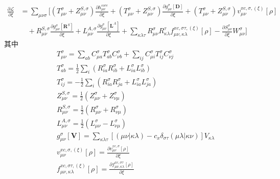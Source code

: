 \documentclass[11pt]{ctexart}
\numberwithin{equation}{section}
\begin{document}
\begin{equation}\label{eq:partial L}
    \begin{aligned}
        \frac{\partial\mathcal{L}}{\partial\xi} 
        &= \sum_{\mu\nu\sigma}\Bigg[
            (T_{\mu\nu}^{\sigma} + Z_{\mu\nu}^{S,\sigma})\frac{\partial h_{\mu\nu}^{core}}{\partial\xi}
            + (T_{\mu\nu}^{\sigma} + Z_{\mu\nu}^{S,\sigma})\frac{\partial g_{\mu\nu}^{\sigma}[\mathbf{D}]}{\partial\xi}
            + (T_{\mu\nu}^{\sigma} + Z_{\mu\nu}^{S,\sigma})v_{\mu\nu}^{xc,\sigma,(\xi)}[\rho]\\
        &\quad + R_{\mu\nu}^{S,\sigma}\frac{\partial g_{\mu\nu}^{\sigma}[\mathbf{R}^{S}]}{\partial\xi}
        + L_{\mu\nu}^{A,\sigma}\frac{\partial g_{\mu\nu}^{\sigma}[\mathbf{L}^{A}]}{\partial\xi}
        + \sum_{\kappa\lambda\tau}R_{\mu\nu}^{\sigma}R_{\kappa\lambda}^{\tau}f_{\mu\nu,\kappa\lambda}^{xc,\sigma\tau,(\xi)}[\rho] 
        - \frac{\partial S_{\mu\nu}^{\sigma}}{\partial\xi} W_{\mu\nu}^{\sigma}
        \Bigg]
    \end{aligned}
\end{equation}
其中
\begin{equation}
    \begin{aligned}
        & T_{\mu\nu}^{\sigma} = \sum_{ab} C_{\mu a}^{\sigma}T_{ab}^{\sigma}C_{\nu b}^{\sigma}
            + \sum_{ij}C_{\mu i}^{\sigma}T_{ij}^{\sigma}C_{\nu j}^{\sigma}\\
        & T_{ab}^{\sigma} = \frac{1}{2}\sum_{i}(R_{ia}^{\sigma}R_{ib}^{\sigma}+L_{ia}^{\sigma}L_{ib}^{\sigma})\\
        & T_{ij}^{\sigma} = - \frac{1}{2}\sum_{i}(R_{ia}^{\sigma}R_{ja}^{\sigma}+L_{ia}^{\sigma}L_{ja}^{\sigma})\\
        & Z_{\mu\nu}^{S,\sigma} = \frac{1}{2}(Z_{\mu\nu}^{\sigma} + Z_{\nu\mu}^{\sigma})\\
        & R_{\mu\nu}^{S,\sigma} = \frac{1}{2}(R_{\mu\nu}^{\sigma}+R_{\nu\mu}^{\sigma})\\
        & L_{\mu\nu}^{A,\sigma} = \frac{1}{2}(L_{\mu\nu}^{\sigma}-L_{\nu\mu}^{\sigma})\\
        & g_{\mu\nu}^{\sigma}[\mathbf{V}] = \sum_{\kappa\lambda\tau}[(\mu\nu|\kappa\lambda)-c_x\delta_{\sigma\tau}(\mu\lambda|\kappa\nu)]V_{\kappa\lambda}\\
        & v_{\mu\nu}^{xc,\sigma,(\xi)}[\rho] = \frac{\partial v_{\mu\nu}^{xc,\sigma}[\rho]}{\partial \xi}\\
        & f_{\mu\nu,\kappa\lambda}^{xc,\sigma\tau,(\xi)}[\rho] = \frac{\partial f_{\mu\nu,\kappa\lambda}^{xc,\sigma\tau}[\rho]}{\partial\xi}
    \end{aligned}    
\end{equation}
\end{document}
